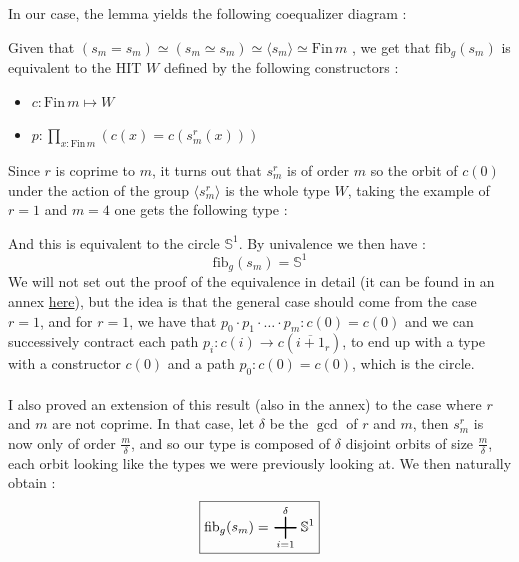 \documentclass{report}
\DeclareMathOperator*{\bigplus}{\scalerel*{+}{\sum}}
\begin{document}
In our case, the lemma yields the following coequalizer diagram :
\begin{center}
\end{center}
Given that $(s_m = s_m) \simeq (s_m \simeq s_m) \simeq \langle s_m \rangle \simeq \mathrm{Fin} \hspace{2pt} m$ , we get that $\mathrm{fib}_g(s_m)$ is equivalent to the HIT $W$ defined by the following constructors : 
\begin{itemize}
  \item $c : \mathrm{Fin} \hspace{2pt} m \mapsto W$
  \item $ p : \prod_{x : \mathrm{Fin}\hspace{2pt} m} (c(x) = c(s_m^r(x)))$
\end{itemize}
Since $r$ is coprime to $m$, it turns out that $s_m^r$ is of order $m$ so the orbit of $c(0)$ under the action of the group $\langle s_m^r \rangle$ is the whole type $W$, taking the example of $r=1$ and $m=4$ one gets the following type :
\begin{center}
\end{center}
And this is equivalent to the circle $\mathbb{S}^1$. By univalence we then have :
$$\boxed{\mathrm{fib}_g(s_m) = \mathbb{S}^1}$$
We will not set out the proof of the equivalence in detail (it can be found in an annex \href{https://github.com/dlaird-ens/Stage-L3/blob/main/Rapport/annexes/Fibre.pdf}{here}), but the idea is that the general case should come from the case $r=1$, and for $r=1$, we have that $p_0 \cdot p_1 \cdot \ldots \cdot p_m : c(0)=c(0)$ and we can successively contract each path $p_i : c(i)\rightarrow c(\overline{i+1}_r)$, to end up with a type with a constructor $c(0)$ and a path $p_0 : c(0) = c(0)$, which is the circle. \\\\
I also proved an extension of this result (also in the annex) to the case where $r$ and $m$ are not coprime. In that case, let $\delta$ be the $\gcd$ of $r$ and $m$, then $s_m^r$ is now only of order $\frac m{\delta}$, and so our type is composed of $\delta$ disjoint orbits of size $\frac m{\delta}$, each orbit looking like the types we were previously looking at. We then naturally obtain : 
$$\boxed{\mathrm{fib}_g(s_m) = \bigplus_{i=1}^{\delta} \mathbb{S}^1}$$
\end{document}
